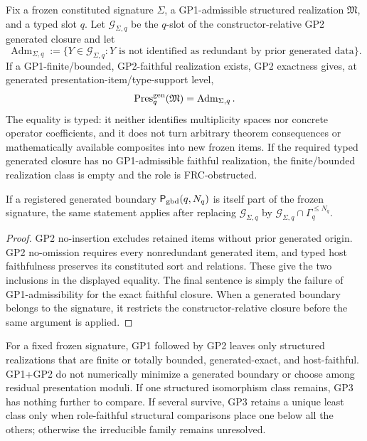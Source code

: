 \documentclass[12pt,a4paper]{article}
\begin{document}
\begin{proposition}
\label{p2:prop:gp1-gp2-bounded-generated-exactness}
Fix a frozen constituted signature \(\Sigma\), a GP1-admissible structured
realization \(\mathfrak M\), and a typed slot \(q\).  Let
\(\mathcal G_{\Sigma,q}\) be the \(q\)-slot of the constructor-relative GP2
generated closure and let
\[
 \operatorname{Adm}_{\Sigma,q}
 :=\{Y\in\mathcal G_{\Sigma,q}:
 Y\text{ is not identified as redundant by prior generated data}\}.
\]
If a GP1-finite/bounded, GP2-faithful realization exists, GP2 exactness gives,
at generated presentation-item/type-support level,
\[
 \operatorname{Pres}^{\rm gen}_q(\mathfrak M)
 =\operatorname{Adm}_{\Sigma,q}.
\]
The equality is typed: it neither identifies multiplicity spaces nor concrete
operator coefficients, and it does not turn arbitrary theorem consequences or
mathematically available composites into new frozen items.  If the required
typed generated closure has no GP1-admissible faithful realization, the
finite/bounded realization class is empty and the role is FRC-obstructed.

If a registered generated boundary \(\mathsf P_{\rm gbd}(q,N_q)\) is itself
part of the frozen signature, the same statement applies after replacing
\(\mathcal G_{\Sigma,q}\) by
\(\mathcal G_{\Sigma,q}\cap\Gamma_q^{\le N_q}\).
\end{proposition}

\begin{proof}
GP2 no-insertion excludes retained items without prior generated origin.  GP2
no-omission requires every nonredundant generated item, and typed host
faithfulness preserves its constituted sort and relations.  These give the
two inclusions in the displayed equality.  The final sentence is simply the
failure of GP1-admissibility for the exact faithful closure.  When a generated
boundary belongs to the signature, it restricts the constructor-relative
closure before the same argument is applied.
\end{proof}

\begin{corollary}
\label{p2:cor:gp1-gp2-admissible-family}
For a fixed frozen signature, GP1 followed by GP2 leaves only structured
realizations that are finite or totally bounded, generated-exact, and
host-faithful.  GP1+GP2 do not numerically minimize a generated boundary or
choose among residual presentation moduli.  If one structured isomorphism
class remains, GP3 has nothing further to compare.  If several survive, GP3
retains a unique least class only when role-faithful structural comparisons
place one below all the others; otherwise the irreducible family remains
unresolved.
\end{corollary}
\end{document}
